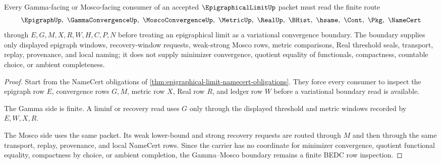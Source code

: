 \begin{theorem}
\label{thm:epigraphical-limit-gamma-mosco-boundary}
Every Gamma-facing or Mosco-facing consumer of an accepted $\EpigraphicalLimitUp$ packet must read the finite route
$$
\EpigraphUp,\ \GammaConvergenceUp,\ \MoscoConvergenceUp,\ \MetricUp,\ \RealUp,\ \BHist,\ \hsame,\ \Cont,\ \Pkg,\ \NameCert
$$
through $E,G,M,X,R,W,H,C,P,N$ before treating an epigraphical limit as a variational convergence boundary. The boundary supplies only displayed epigraph windows, recovery-window requests, weak-strong Mosco rows, metric comparisons, Real threshold seals, transport, replay, provenance, and local naming; it does not supply minimizer convergence, quotient equality of functionals, compactness, countable choice, or ambient completeness.
\end{theorem}
\begin{proof}
Start from the NameCert obligations of \autoref{thm:epigraphical-limit-namecert-obligations}. They force every consumer to inspect the epigraph row $E$, convergence rows $G,M$, metric row $X$, Real row $R$, and ledger row $W$ before a variational boundary read is available.

The Gamma side is finite. A liminf or recovery read uses $G$ only through the displayed threshold and metric windows recorded by $E,W,X,R$.

The Mosco side uses the same packet. Its weak lower-bound and strong recovery requests are routed through $M$ and then through the same transport, replay, provenance, and local NameCert rows. Since the carrier has no coordinate for minimizer convergence, quotient functional equality, compactness by choice, or ambient completion, the Gamma--Mosco boundary remains a finite BEDC row inspection.
\end{proof}



